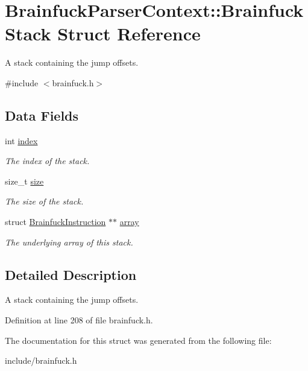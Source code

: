 \hypertarget{structBrainfuckParserContext_1_1BrainfuckStack}{}\section{Brainfuck\+Parser\+Context\+:\+:Brainfuck\+Stack Struct Reference}
\label{structBrainfuckParserContext_1_1BrainfuckStack}


A stack containing the jump offsets.  




{\ttfamily \#include $<$brainfuck.\+h$>$}

\subsection*{Data Fields}
\begin{DoxyCompactItemize}
\item 
\hypertarget{structBrainfuckParserContext_1_1BrainfuckStack_a6c64b1de6469a32b57d7e55bb790ea51}{}int \hyperlink{structBrainfuckParserContext_1_1BrainfuckStack_a6c64b1de6469a32b57d7e55bb790ea51}{index}\label{structBrainfuckParserContext_1_1BrainfuckStack_a6c64b1de6469a32b57d7e55bb790ea51}

\begin{DoxyCompactList}\small\item\em The index of the stack. \end{DoxyCompactList}\item 
\hypertarget{structBrainfuckParserContext_1_1BrainfuckStack_aa3b67a3b0a778fbfc657cf5cedec603b}{}size\+\_\+t \hyperlink{structBrainfuckParserContext_1_1BrainfuckStack_aa3b67a3b0a778fbfc657cf5cedec603b}{size}\label{structBrainfuckParserContext_1_1BrainfuckStack_aa3b67a3b0a778fbfc657cf5cedec603b}

\begin{DoxyCompactList}\small\item\em The size of the stack. \end{DoxyCompactList}\item 
\hypertarget{structBrainfuckParserContext_1_1BrainfuckStack_a519718e0d415dc20cf5e071a8364d9f6}{}struct \hyperlink{structBrainfuckInstruction}{Brainfuck\+Instruction} $\ast$$\ast$ \hyperlink{structBrainfuckParserContext_1_1BrainfuckStack_a519718e0d415dc20cf5e071a8364d9f6}{array}\label{structBrainfuckParserContext_1_1BrainfuckStack_a519718e0d415dc20cf5e071a8364d9f6}

\begin{DoxyCompactList}\small\item\em The underlying array of this stack. \end{DoxyCompactList}\end{DoxyCompactItemize}


\subsection{Detailed Description}
A stack containing the jump offsets. 

Definition at line 208 of file brainfuck.\+h.



The documentation for this struct was generated from the following file\+:\begin{DoxyCompactItemize}
\item 
include/brainfuck.\+h\end{DoxyCompactItemize}

